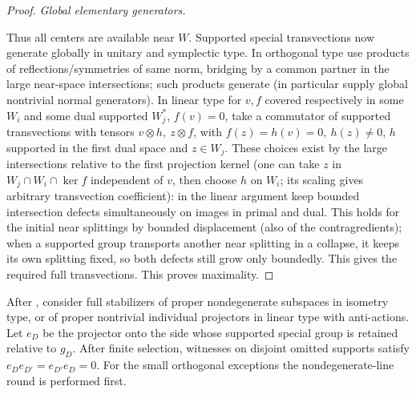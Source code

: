 \begin{proof}
\smallskip\noindent\emph{Global elementary generators.}

Thus all centers are available near \(W\). Supported special transvections now generate globally in
unitary and symplectic type. In orthogonal type use products of reflections/symmetries of same norm,
bridging by a common partner in the large near-space intersections; such products generate (in particular
supply global nontrivial normal generators). In linear type for \(v,f\) covered respectively in some
\(W_i\) and some dual supported \(W_j^*\), \(f(v)=0\), take a commutator of supported transvections with
tensors \(v\otimes h,\ z\otimes f\), with \(f(z)=h(v)=0,\ h(z)\ne0\), \(h\) supported in the first dual
space and \(z\in W_j\). These choices exist by the large intersections relative to the first projection
kernel (one can take \(z\) in \(W_j\cap W_i\cap\ker f\) independent of \(v\), then choose \(h\) on
\(W_i\); its scaling gives arbitrary transvection coefficient): in the linear argument keep bounded
intersection defects simultaneously on images in primal and dual. This holds for the initial near
splittings by bounded displacement (also of the contragredients); when a supported group transports
another near splitting in a collapse, it keeps its own splitting fixed, so both defects still grow only
boundedly. This gives the required full transvections. This proves maximality.\qedhere

\end{proof}

\begin{lemma}\label{fa:projector-orthogonal}
After , consider full stabilizers of proper nondegenerate
subspaces in isometry type, or of proper nontrivial individual projectors in linear type with
anti-actions.  Let \(e_D\) be the projector onto the side whose supported special group is retained
relative to \(g_D\).  After finite selection, witnesses on disjoint omitted supports satisfy
\(e_De_{D'}=e_{D'}e_D=0\).  For the small orthogonal exceptions the nondegenerate-line round is performed
first.
\end{lemma}

